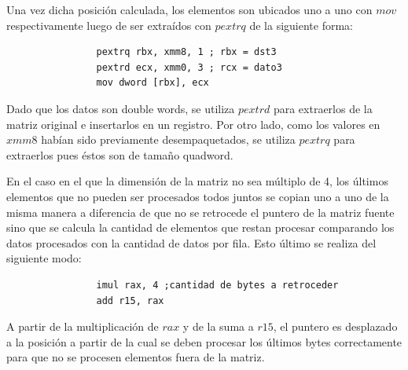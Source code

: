 \documentclass[10pt, a4paper]{article}
\begin{document}
Una vez dicha posición calculada, los elementos son ubicados uno a uno con $mov$ respectivamente luego de ser extraídos con $pextrq$ de la siguiente forma:
\begin{verbatim}
                pextrq rbx, xmm8, 1 ; rbx = dst3
                pextrd ecx, xmm0, 3 ; rcx = dato3
                mov dword [rbx], ecx
\end{verbatim}

Dado que los datos son double words, se utiliza $pextrd$ para extraerlos de la matriz original e insertarlos en un registro. Por otro lado, como los valores en $xmm8$ habían sido previamente desempaquetados, se utiliza $pextrq$ para extraerlos pues éstos son de tamaño quadword.

En el caso en el que la dimensión de la matriz no sea múltiplo de 4, los últimos elementos que no pueden ser procesados todos juntos se copian uno a uno de la misma manera a diferencia de que no se retrocede el puntero de la matriz fuente sino que se calcula la cantidad de elementos que restan procesar comparando los datos procesados con la cantidad de datos por fila. Esto último se realiza del siguiente modo:
\begin{verbatim}
                imul rax, 4 ;cantidad de bytes a retroceder            
                add r15, rax
\end{verbatim}
A partir de la multiplicación de $rax$ y de la suma a $r15$, el puntero es desplazado a la posición a partir de la cual se deben procesar los últimos bytes correctamente para que no se procesen elementos fuera de la matriz.\newline
\end{document}
